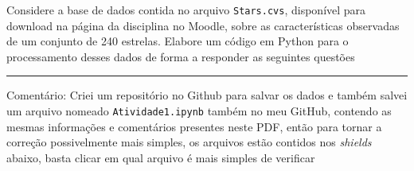 Considere a base de dados contida no arquivo \verb|Stars.cvs|, disponível para download na página da disciplina no Moodle, sobre as características observadas de um conjunto de 240 estrelas.
Elabore um código em Python para o processamento desses dados de forma a responder as seguintes questões

\rule{\linewidth}{1pt}

Comentário: Criei um repositório no Github para salvar os dados e também salvei um arquivo nomeado \verb|Atividade1.ipynb| também no meu GitHub, contendo as mesmas informações e comentários presentes neste PDF, então para tornar a correção possivelmente mais simples, os arquivos estão contidos nos \textit{shields} abaixo, basta clicar em qual arquivo é mais simples de verificar

\begin{center}
\end{center}